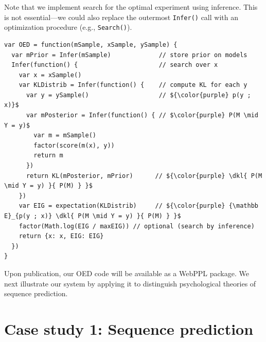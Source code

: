 \documentclass{article}
\newcommand{\dkl}{D_\mathrm{KL}\infdivx}
\newcommand{\ndg}[1]{\textcolor{Green}{[ndg: #1]}}
\begin{document}
Note that we implement search for the optimal experiment using inference.
This is not essential---we could also replace the outermost \lstinline|Infer()| call with an optimization procedure (e.g., \lstinline|Search()|).

\begin{lstlisting}[mathescape, label={code:oed-pp}, caption = {OED implementation. For clarity, we have omitted some book-keeping details.}]
var OED = function(mSample, xSample, ySample) {
  var mPrior = Infer(mSample)             // store prior on models
  Infer(function() {                      // search over x
    var x = xSample()
    var KLDistrib = Infer(function() {    // compute KL for each y
      var y = ySample()                   // ${\color{purple} p(y ; x)}$
      var mPosterior = Infer(function() { // $\color{purple} P(M \mid Y = y)$
        var m = mSample()
        factor(score(m(x), y))
        return m
      })
      return KL(mPosterior, mPrior)      // ${\color{purple} \dkl{ P(M \mid Y = y) }{ P(M) } }$
    })
    var EIG = expectation(KLDistrib)     // ${\color{purple} {\mathbb E}_{p(y ; x)} \dkl{ P(M \mid Y = y) }{ P(M) } }$
    factor(Math.log(EIG / maxEIG)) // optional (search by inference)
    return {x: x, EIG: EIG}
  })
}
\end{lstlisting}
Upon publication, our OED code will be available as a WebPPL package. %
We next illustrate our system by applying it to distinguish psychological theories of sequence prediction.

\section{Case study 1: Sequence prediction}
\label{s:tutorial}
\end{document}
